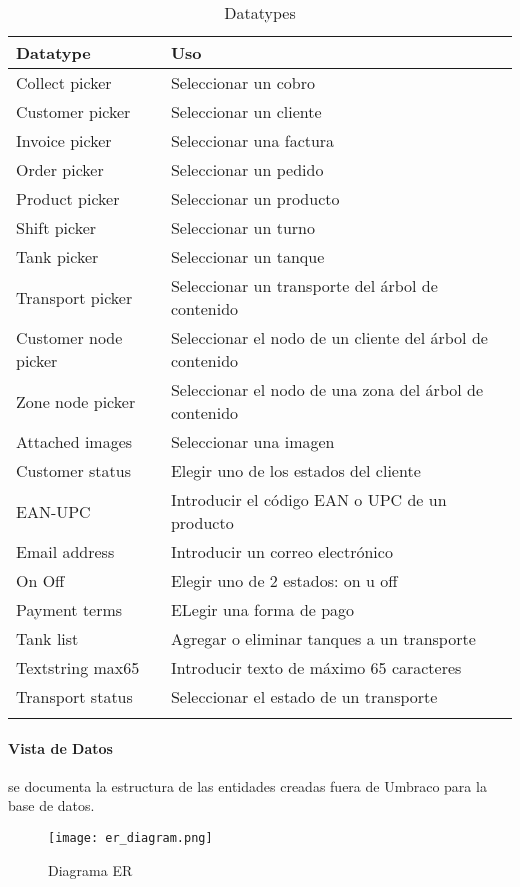 \begin{longtable}{  l | l  }
    \hline\hline
    \rowcolor{gray!30}
    \textbf{Datatype} & \textbf{Uso} \\
    \hline\hline
    \endhead

    \hline
    \endfoot

    \endlastfoot

    Collect picker & Seleccionar un cobro \\
    Customer picker & Seleccionar un cliente \\
    Invoice picker & Seleccionar una factura \\
    Order picker & Seleccionar un pedido \\
    Product picker & Seleccionar un producto \\
    Shift picker & Seleccionar un turno \\
    Tank picker & Seleccionar un tanque \\
    Transport picker & Seleccionar un transporte del árbol de contenido \\
    Customer node picker & Seleccionar el nodo de un cliente del árbol de contenido \\
    Zone node picker & Seleccionar el nodo de una zona del árbol de contenido \\
    Attached images & Seleccionar una imagen \\
    Customer status & Elegir uno de los estados del cliente \\
    EAN-UPC & Introducir el código EAN o UPC de un producto \\
    Email address & Introducir un correo electrónico \\
    On Off & Elegir uno de 2 estados: on u off \\
    Payment terms & ELegir una forma de pago \\
    Tank list & Agregar o eliminar tanques a un transporte \\
    Textstring max65 & Introducir texto de máximo 65 caracteres \\
    Transport status & Seleccionar el estado de un transporte \\

    \hline

    \caption{Datatypes}
    \label{table:datatypes}
\end{longtable}

\paragraph{Vista de Datos} se documenta la estructura de las entidades creadas fuera de Umbraco para la base de datos.
\begin{figure}[H]
    \centering
    \texttt{[image: er\_diagram.png]}
    \caption{Diagrama ER}
    \label{fig:er_diagram}
\end{figure}